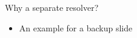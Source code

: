 \begin{frame}{Why a separate resolver?}

  \large
  \begin{itemize}
  \item An example for a backup slide
  \end{itemize}

\end{frame}

